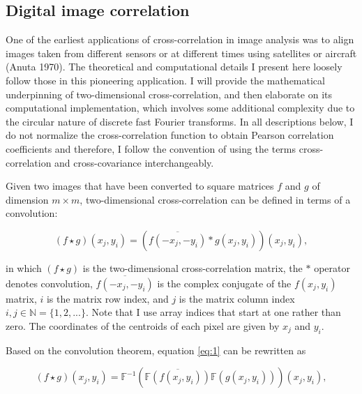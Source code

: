 \hypertarget{digital-image-correlation}{%
\subsection{Digital image correlation}\label{digital-image-correlation}}

One of the earliest applications of cross-correlation in image analysis was to align images taken from different sensors or at different times using satellites or aircraft (Anuta 1970). The theoretical and computational details I present here loosely follow those in this pioneering application. I will provide the mathematical underpinning of two-dimensional cross-correlation, and then elaborate on its computational implementation, which involves some additional complexity due to the circular nature of discrete fast Fourier transforms. In all descriptions below, I do not normalize the cross-correlation function to obtain Pearson correlation coefficients and therefore, I follow the convention of using the terms cross-correlation and cross-covariance interchangeably.

Given two images that have been converted to square matrices \(f\) and \(g\) of dimension \(m \times m\), two-dimensional cross-correlation can be defined in terms of a convolution:

\begin{equation}
\left(f \star g\right)\left(x_j, y_i\right)  =  \left(\overline{f\left(-x_j, -y_i\right)} * g\left(x_j, y_i\right)\right)\left(x_j, y_i\right),
\label{eq:1}
\end{equation}

\noindent in which \(\left(f \star g\right)\) is the two-dimensional cross-correlation matrix, the \(*\) operator denotes convolution, \(\overline{f\left(-x_j, -y_i\right)}\) is the complex conjugate of the \(f\left(x_j, y_i\right)\) matrix, \(i\) is the matrix row index, and \(j\) is the matrix column index \(i, j \in \mathbb{N} = \{1, 2, . . .\}\). Note that I use array indices that start at one rather than zero. The coordinates of the centroids of each pixel are given by \(x_j\) and \(y_i\).

Based on the convolution theorem, equation \eqref{eq:1} can be rewritten as

\begin{equation}
\left(f \star g\right)\left(x_j, y_i\right)  = \mathbb{F}^{-1}\left(\overline{\mathbb{F}\left(f\left(x_j, y_i\right)\right)}\mathbb{F}\left(g\left(x_j, y_i\right)\right)\right)\left(x_j, y_i\right), 
\label{eq:2}
\end{equation}


